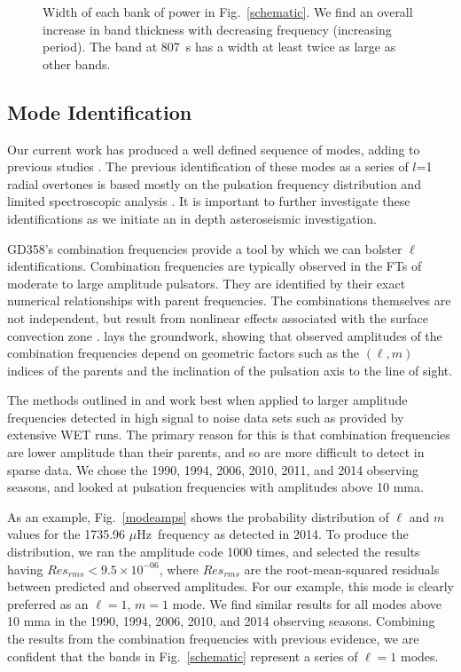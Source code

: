 \documentclass[12pt,preprint]{aastex}
\newcommand{\muHz}{\mbox{$\mu$Hz}}
\begin{document}
\begin{figure}
 \caption{Width of each bank of power in Fig.~\ref{schematic}. We find an overall increase 
 in band thickness with decreasing frequency (increasing period).  The band at 807~s has a width
 at least twice as large as other bands.  
 \label{thick}}
\end{figure}


\subsection{Mode Identification}\label{mode}
Our current work has produced a well defined sequence of modes, adding to 
previous studies \citep{Montgomery10, Provencal09, Metcalfe00, Winget94}. The previous 
identification of these modes as a series of $l$=1 radial overtones is based mostly on 
the pulsation frequency distribution and limited spectroscopic analysis 
\citep{Kotak02, Castanheira05}. It is important to further investigate these identifications 
as we initiate an in depth asteroseismic investigation.  

GD358's combination frequencies provide a tool by which we can bolster $\ell$ identifications. 
Combination frequencies are typically observed in the FTs of moderate to large amplitude pulsators.  
They are identified by their exact numerical relationships with parent frequencies.  
The combinations themselves are not independent, but result from nonlinear effects associated 
with the surface convection zone \citep{Brickhill92, Brassard95, Wu01, Ising01}.  
\citet{Wu01} lays the groundwork, showing that observed amplitudes of the combination 
frequencies depend on geometric factors such as the $(\ell,m)$ indices of the parents and the 
inclination of the pulsation axis to the line of sight.  

The methods outlined in \citet{Provencal12} and \citet{Montgomery10} work best when applied to 
larger amplitude frequencies detected in high signal to noise data sets such as provided by 
extensive WET runs.  The primary reason for this is that combination frequencies are lower 
amplitude than their parents, and so are more difficult to detect in sparse data.  We chose 
the 1990, 1994, 2006, 2010, 2011, and 2014 observing seasons, and looked at pulsation 
frequencies with amplitudes above 10 mma.  

As an example, Fig.~\ref{modeamps} shows the probability distribution of $\ell$ and $m$ 
values for the 1735.96 \muHz\ frequency as detected in 2014. To produce the distribution, we ran
the amplitude code \citep{Montgomery10} 1000 times, and selected the results having $Res_{rms}<9.5\times10^{-06}$, 
where $Res_{rms}$ are the root-mean-squared residuals between predicted and observed amplitudes.  
For our example, this mode is clearly preferred as an $\ell=1$, $m=1$ mode. We find similar results for all
modes above 10 mma in the 1990, 1994, 2006, 2010, and 2014 observing seasons. Combining the results from the 
combination frequencies with previous evidence, we are confident that the bands in Fig.~\ref{schematic} represent
a series of $\ell=1$ modes.  
\end{document}
